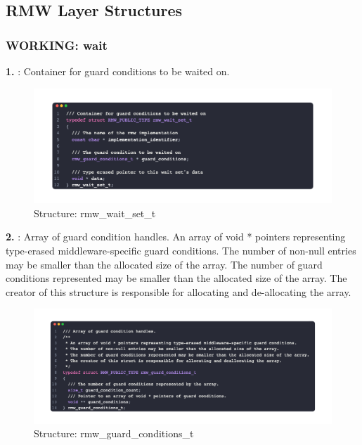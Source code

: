 \subsection{RMW Layer Structures}
\subsubsection{WORKING: wait}
\textbf{1. }: Container for guard conditions to be waited on.
\begin{figure}[htbp!]
    \centering
    \includegraphics[width=1\linewidth]{Sec/Implementation/rmw/fig/rmw_wait_set_t.png}
    \caption{Structure: rmw\_wait\_set\_t}
    \vspace{-0.1in}
\end{figure}

\textbf{2. }: Array of guard condition handles. An array of void * pointers representing type-erased middleware-specific guard conditions. The number of non-null entries may be smaller than the allocated size of the array. The number of guard conditions represented may be smaller than the allocated size of the array. The creator of this structure is responsible for allocating and de-allocating the array.
\begin{figure}[htbp!]
    \centering
    \includegraphics[width=1\linewidth]{Sec/Implementation/rmw/fig/rmw_guard_conditions_t.png}
    \caption{Structure: rmw\_guard\_conditions\_t}
    \vspace{-0.1in}
\end{figure}
